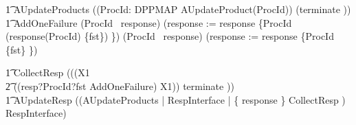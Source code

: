 \begin{circus}
				\t1 AUpdateProducts \circdef ((\Interleave ProcId: DPPMAP \circspot AUpdateProduct(ProcId)) \circseq (terminate \then \Skip)) \\

		\t1 AddOneFailure \circdef \lcircguard (ProcId \in \dom~response) \rcircguard \circguard (response := response \oplus \{ProcId \mapsto (response(ProcId) \cup \{fst\}) \})
        \extchoice \lcircguard (ProcId \notin \dom~response) \rcircguard \circguard (response := response \cup \{ProcId \mapsto \{fst\} \})

				\t1 CollectResp \circdef (((\circmu X1 \circspot \\
            \t2 ((resp?ProcId?fst \then  AddOneFailure) \circseq X1)) \extchoice terminate \then \Skip)) \\

				\t1 AUpdateResp \circdef  ((AUpdateProducts \lpar \emptyset | RespInterface | \{ response \} \rpar CollectResp )  \circhide RespInterface) \\


\end{circus}

